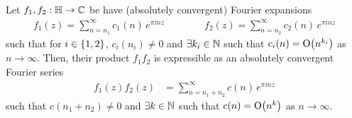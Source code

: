 \begin{boxproposition}\label{Ch4:Prop:PolyGrowth_of_mul}
    Let $f_1, f_2 : \mathbb{H} \to \mathbb{C}$ be have (absolutely convergent) Fourier expansions
    \begin{align*}
        f_1(z) = \sum_{n=n_1}^{\infty} c_1(n) \, e^{\pi i n z} \qquad \qquad
        f_2(z) = \sum_{n=n_2}^{\infty} c_2(n) \, e^{\pi i n z}
    \end{align*}
    such that for $i \in \left\{ 1, 2 \right\}$, $c_i(n_i) \neq 0$ and $\exists k_i \in \mathbb{N}$ such that $c_i(n) = \operatorname{O}\!\left( n^{k_i} \right)$ as $n \to \infty$. Then, their product $f_1 f_2$ is expressible as an absolutely convergent Fourier series
    \begin{align*}
        f_1(z) f_2(z) &= \sum_{n = n_1 + n_2}^{\infty} c(n) \, e^{\pi i n z}
    \end{align*}
    such that $c(n_1 + n_2) \neq 0$ and $\exists k \in \mathbb{N}$ such that $c(n) = \operatorname{O}\!\left( n^k \right)$ as $n \to \infty$.
\end{boxproposition}

